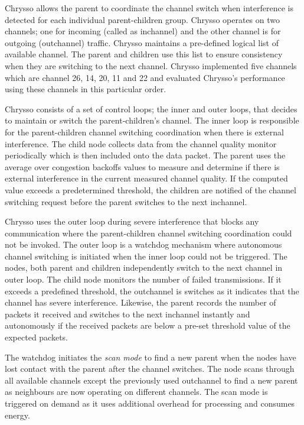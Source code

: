 Chrysso allows the parent to coordinate the channel switch when interference is detected for each individual parent-children group. Chrysso operates on two channels; one for incoming (called as inchannel) and the other channel is for outgoing (outchannel) traffic. Chrysso maintains a pre-defined logical list of available channel. The parent and children use this list to ensure consistency when they are switching to the next channel. Chrysso implemented five channels which are channel 26, 14, 20, 11 and 22 and evaluated Chrysso's performance using these channels in this particular order.

Chrysso consists of a set of control loops; the inner and outer loops, that decides to maintain or switch the parent-children's channel. The inner loop is responsible for the parent-children channel switching coordination when there is external interference. The child node collects data from the channel quality monitor periodically which is then included onto the data packet. The parent uses the average over congestion backoffs values to measure and determine if there is external interference in the current measured channel quality. If the computed value exceeds a predetermined threshold, the children are notified of the channel switching request before the parent switches to the next inchannel.

Chrysso uses the outer loop during severe interference that blocks any communication where the parent-children channel switching coordination could not be invoked. The outer loop is a watchdog mechanism where autonomous channel switching is initiated when the inner loop could not be triggered. The nodes, both parent and children independently switch to the next channel in outer loop. The child node monitors the number of failed transmissions. If it exceeds a predefined threshold, the outchannel is switches as it indicates that the channel has severe interference. Likewise, the parent records the number of packets it received and switches to the next inchannel instantly and autonomously if the received packets are below a pre-set threshold value of the expected packets.

The watchdog initiates the \textit{scan mode} to find a new parent when the nodes have lost contact with the parent after the channel switches. The node scans through all available channels except the previously used outchannel to find a new parent as neighbours are now operating on different channels. The scan mode is triggered on demand as it uses additional overhead for processing and consumes energy. 

